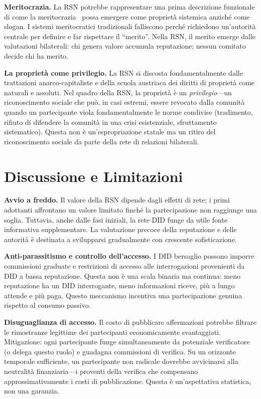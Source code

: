 \documentclass[11pt,a4paper,twocolumn]{article}
\begin{document}
\textbf{Meritocrazia.} La RSN potrebbe rappresentare una prima descrizione funzionale di come la meritocrazia~\cite{young1958} possa emergere come proprietà sistemica anziché come slogan. I sistemi meritocratici tradizionali falliscono perché richiedono un'autorità centrale per definire e far rispettare il ``merito''. Nella RSN, il merito emerge dalle valutazioni bilaterali: chi genera valore accumula reputazione; nessun comitato decide chi ha merito.

\textbf{La proprietà come privilegio.} La RSN si discosta fondamentalmente dalle trattazioni anarco-capitaliste e della scuola austriaca dei diritti di proprietà come naturali e assoluti. Nel quadro della RSN, la proprietà è un \emph{privilegio}---un riconoscimento sociale che può, in casi estremi, essere revocato dalla comunità quando un partecipante viola fondamentalmente le norme condivise (tradimento, rifiuto di difendere la comunità in una crisi esistenziale, sfruttamento sistematico). Questa non è un'espropriazione statale ma un ritiro del riconoscimento sociale da parte della rete di relazioni bilaterali.

\section{Discussione e Limitazioni}

\textbf{Avvio a freddo.} Il valore della RSN dipende dagli effetti di rete; i primi adottanti affrontano un valore limitato finché la partecipazione non raggiunge una soglia. Tuttavia, anche dalle fasi iniziali, la rete DID funge da utile fonte informativa supplementare. La valutazione precoce della reputazione e delle autorità è destinata a svilupparsi gradualmente con crescente sofisticazione.

\textbf{Anti-parassitismo e controllo dell'accesso.} I DID bersaglio possono imporre commissioni graduate e restrizioni di accesso alle interrogazioni provenienti da DID a bassa reputazione. Questa non è una scala binaria ma continua: meno reputazione ha un DID interrogante, meno informazioni riceve, più a lungo attende e più paga. Questo meccanismo incentiva una partecipazione genuina rispetto al consumo passivo.

\textbf{Disuguaglianza di accesso.} Il costo di pubblicare affermazioni potrebbe filtrare le rimostranze legittime dei partecipanti economicamente svantaggiati. Mitigazione: ogni partecipante funge simultaneamente da potenziale verificatore (o delega questo ruolo) e guadagna commissioni di verifica. Su un orizzonte temporale sufficiente, un partecipante non radicale dovrebbe avvicinarsi alla neutralità finanziaria---i proventi della verifica che compensano approssimativamente i costi di pubblicazione. Questa è un'aspettativa statistica, non una garanzia.
\end{document}
